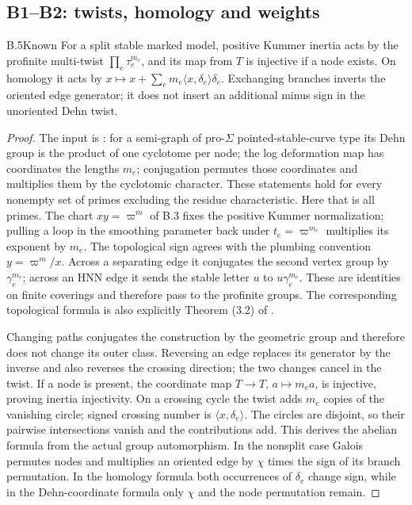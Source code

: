 \subsection{B1--B2: twists, homology and weights}

\begin{claim}{B.5}{Known}
For a split stable marked model, positive Kummer inertia acts by the
profinite multi-twist $\prod_e\tau_e^{m_e}$, and its map from $T$ is
injective if a node exists. On homology it acts by
$x\mapsto x+\sum_e m_e\langle x,\delta_e\rangle\delta_e$.
Exchanging branches inverts the oriented edge generator; it does not insert
an additional minus sign in the unoriented Dehn twist.
\end{claim}
\begin{proof}
The input is \citet[Theorem 4.8(iv)--(v), Lemma 5.4(ii)--(iii),
Corollary 5.9]{BC_HMTopics}: for a semi-graph of pro-$\Sigma$
pointed-stable-curve type its Dehn group is the product of one cyclotome per
node; the log deformation map has coordinates the lengths $m_e$; conjugation
permutes those coordinates and multiplies them by the cyclotomic character.
These statements hold for every nonempty set of primes excluding the
residue characteristic. Here that is all primes. The chart $xy=\varpi^m$
of B.3 fixes the positive Kummer normalization; pulling a loop in the
smoothing parameter back under $t_e=\varpi^{m_e}$ multiplies its exponent
by $m_e$. The topological sign agrees with the plumbing convention
$y=\varpi^m/x$. Across a separating edge it conjugates the second vertex
group by $\gamma_e^{m_e}$; across an HNN edge it sends the stable letter
$u$ to $u\gamma_e^{m_e}$. These are identities on finite coverings and
therefore pass to the profinite groups. The corresponding topological
formula is also explicitly Theorem (3.2) of
\citet{BC_AMO}.

Changing paths conjugates the construction by the geometric group and
therefore does not change its outer class. Reversing an edge replaces its
generator by the inverse and also reverses the crossing direction; the
two changes cancel in the twist. If a node is present, the coordinate map
$T\to T$, $a\mapsto m_ea$, is injective, proving inertia injectivity.
On a crossing cycle the twist adds $m_e$ copies of the vanishing circle;
signed crossing number is $\langle x,\delta_e\rangle$. The circles are
disjoint, so their pairwise intersections vanish and the contributions add.
This derives the abelian formula from the actual group automorphism.
In the nonsplit case Galois permutes nodes and multiplies an oriented edge
by $\chi$ times the sign of its branch permutation. In the homology formula
both occurrences of $\delta_e$ change sign, while in the Dehn-coordinate
formula only $\chi$ and the node permutation remain.
\end{proof}

